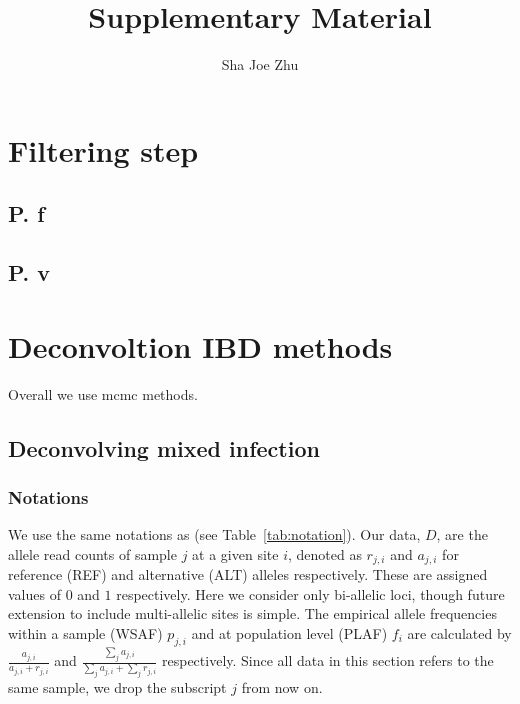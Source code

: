 \documentclass{article}
\title{Supplementary Material}
\author{Sha Joe Zhu}
\date{}
\begin{document}
\maketitle{}
\listoftodos
\clearpage
\setcounter{page}{1}

\maketitle
\tableofcontents

\setcounter{section}{0}

\newpage


\section{Filtering step}
\subsection{P. f}

\subsection{P. v}

\newpage

\section{Deconvoltion IBD methods}

Overall we use mcmc methods.



\subsection{Deconvolving mixed infection}
\subsubsection{Notations}
We use the same notations as \citet{Zhu2017} (see Table~\ref{tab:notation}). Our data, $D$, are the allele read counts of sample $j$ at a given site $i$, denoted as $r_{j,i}$ and $a_{j,i}$ for reference (REF) and alternative (ALT) alleles respectively.  These are assigned values of $0$ and $1$ respectively. Here we consider only bi-allelic loci, though future extension to include multi-allelic sites is simple.  The empirical allele frequencies within a sample (WSAF) $p_{j,i}$ and at population level (PLAF) $f_i$ are calculated by $ \frac{a_{j,i}}{a_{j,i} + r_{j,i}}$ and $ \frac{\sum_j a_{j,i}}{\sum_j a_{j,i} + \sum_j r_{j,i}}$ respectively. Since all data in this section refers to the same sample, we drop the subscript $j$ from now on.
\end{document}

